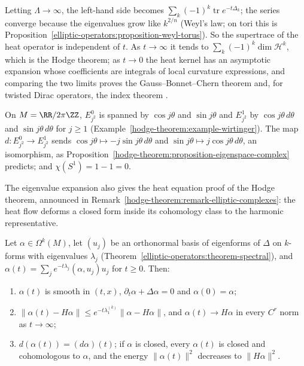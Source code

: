 \begin{remark}\label{hodge-theorem:remark-heat-kernel}
Letting $\Lambda \to \infty$, the left-hand side becomes $\sum_k(-1)^k\operatorname{tr}e^{-t\Delta_k}$; the series converge because the eigenvalues grow like $k^{2/n}$ (Weyl's law; on tori this is
Proposition~\ref{elliptic-operators:proposition-weyl-torus}). So the supertrace of the heat operator is independent of $t$. As $t \to \infty$ it tends to $\sum_k(-1)^k\dim\mathcal{H}^k$, which is the Hodge
theorem; as $t \to 0$ the heat kernel has an asymptotic expansion whose coefficients are integrals of local curvature expressions, and comparing the two limits proves the Gauss--Bonnet--Chern theorem and,
for twisted Dirac operators, the index theorem \cite{lawson-michelsohn}.
\end{remark}

\begin{example}\label{hodge-theorem:example-circle-eigenspaces}
On $M = \RR/2\pi\ZZ$, $E^0_{j^2}$ is spanned by $\cos j\theta$ and $\sin j\theta$ and $E^1_{j^2}$ by $\cos j\theta\,d\theta$ and $\sin j\theta\,d\theta$ for $j \geq 1$ (Example~\ref{hodge-theorem:example-wirtinger}). The map
$d \colon E^0_{j^2} \to E^1_{j^2}$ sends $\cos j\theta \mapsto -j\sin j\theta\,d\theta$ and $\sin j\theta \mapsto j\cos j\theta\,d\theta$, an isomorphism, as Proposition~\ref{hodge-theorem:proposition-eigenspace-complex} predicts;
and $\chi(S^1) = 1 - 1 = 0$.
\end{example}

The eigenvalue expansion also gives the heat equation proof of the Hodge theorem, announced in Remark~\ref{hodge-theorem:remark-elliptic-complexes}: the heat flow deforms a closed form inside its cohomology
class to the harmonic representative.

\begin{proposition}\label{hodge-theorem:proposition-heat-flow}
Let $\alpha \in \Omega^k(M)$, let $(u_j)$ be an orthonormal basis of eigenforms of $\Delta$ on $k$-forms with eigenvalues $\lambda_j$ (Theorem~\ref{elliptic-operators:theorem-spectral}), and
$\alpha(t) = \sum_je^{-t\lambda_j}(\alpha, u_j)u_j$ for $t \geq 0$. Then:
\begin{enumerate}
\item $\alpha(t)$ is smooth in $(t, x)$, $\partial_t\alpha + \Delta\alpha = 0$ and $\alpha(0) = \alpha$;
\item $\|\alpha(t) - H\alpha\| \leq e^{-t\lambda_1^{(k)}}\|\alpha - H\alpha\|$, and $\alpha(t) \to H\alpha$ in every $C^r$ norm as $t \to \infty$;
\item $d(\alpha(t)) = (d\alpha)(t)$; if $\alpha$ is closed, every $\alpha(t)$ is closed and cohomologous to $\alpha$, and the energy $\|\alpha(t)\|^2$ decreases to $\|H\alpha\|^2$.
\end{enumerate}
\end{proposition}

